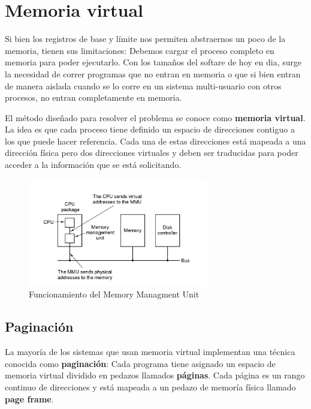 \newpage
\section{Memoria virtual}
Si bien los registros de base y límite nos permiten abstraernos un poco de la memoria, tienen sus limitaciones: Debemos cargar el proceso completo en memoria para poder ejecutarlo. Con los tamaños del softare de hoy en dia, surge la necesidad  de correr programas que no entran en memoria o que si bien entran de manera aislada cuando se lo corre en un sistema multi-usuario con otros procesos, no entran completamente en memoria.

El método diseñado para resolver el problema se conoce como \textbf{memoria virtual}. La idea es que cada proceso tiene definido un espacio de direcciones contiguo a los que puede hacer referencia. Cada una de estas direcciones está mapeada a una dirección física pero dos direcciones virtuales y deben ser traducidas para poder acceder a la información que se está solicitando.

\begin{figure}[h]
	\centering
	\includegraphics[width=0.7\textwidth]{imagenes/mmu-paging}
	\caption{Funcionamiento del Memory Managment Unit}
	\label{fig:mmu-paging}
\end{figure}

\subsection{Paginación}
La mayoría de los sistemas que usan memoria virtual implementan una técnica conocida como \textbf{paginación}: Cada programa tiene asignado un espacio de memoria virtual dividido en pedazos llamados \textbf{páginas}. Cada página es un rango continuo de direcciones y está mapeada a un pedazo de memoría física llamado \textbf{page frame}.

